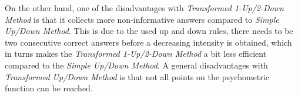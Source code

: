 On the other hand, one of the disadvantages with \textit{Transformed 1-Up/2-Down Method} is that it collects more non-informative answers compared to \textit{Simple Up/Down Method}. This is due to the used up and down rules, there needs to be two consecutive correct answers before a decreasing intensity is obtained, which in turns makes the \textit{Transformed 1-Up/2-Down Method} a bit less efficient compared to the \textit{Simple Up/Down Method}. A general disadvantages with \textit{Transformed Up/Down Method} is that not all points on the psychometric function can be reached.          
%